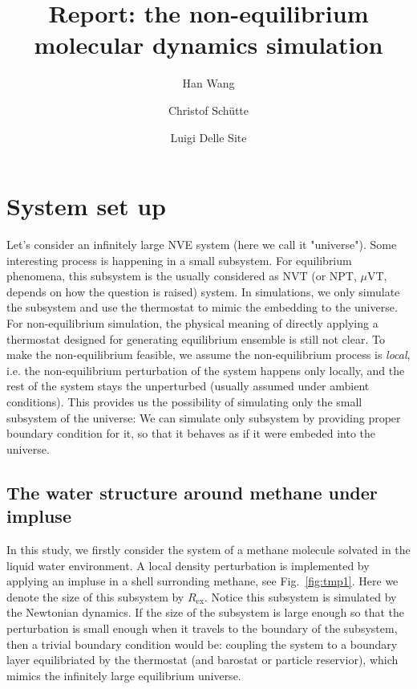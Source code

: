 \documentclass[aip,jcp,a4paper,reprint,onecolumn]{revtex4-1}
\newcommand{\ex}{{\textrm{ex}}}
\begin{document}
\title{Report: the non-equilibrium molecular dynamics simulation}
\author{Han Wang}
\author{Christof Sch\"utte}
\author{Luigi Delle Site}

\begin{abstract}
\end{abstract}

\maketitle

\newpage

\section{System set up}


Let's consider an infinitely large NVE system (here we call it
"universe"). Some interesting process is happening in a small subsystem. For
equilibrium phenomena, this subsystem is the usually considered as NVT
(or NPT, $\mu$VT, depends on how the question is raised) system.
In simulations, we only simulate the subsystem and
use the thermostat to mimic the embedding to the universe.
For non-equilibrium simulation, the physical meaning of directly applying
a thermostat designed for generating equilibrium ensemble is still
not clear. To make the non-equilibrium feasible, we assume the
non-equilibrium process is \emph{local}, i.e. the non-equilibrium perturbation
of the system happens only locally, and the rest of the system
stays the unperturbed (usually assumed under ambient conditions).
This provides us the possibility of simulating only the small subsystem
of the universe: We can simulate only subsystem by providing proper
boundary condition for it, so that it behaves as if it were embeded into
the universe.

\subsection{The water structure around methane under impluse }
In this study, we firstly consider the system of a methane molecule solvated
in the liquid water environment. A local density perturbation is implemented
by applying an impluse  in a shell surronding methane, see Fig.~\ref{fig:tmp1}.
Here we denote the size of this subsystem by $R_{\ex}$.
Notice this subsystem is simulated by the Newtonian
dynamics. If the size of the
subsystem is large enough so that the perturbation is
small enough when it travels to the boundary of the subsystem, then a
trivial boundary condition would be: coupling the system to a boundary
layer equilibriated by the thermostat (and barostat or particle reservior),
which mimics the infinitely large equilibrium universe.
\end{document}
